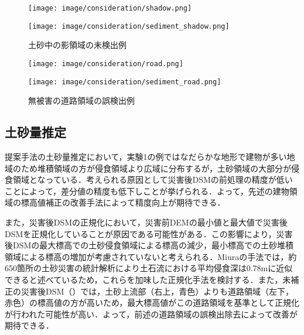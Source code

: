       \begin{figure}[tbp]
        \begin{minipage}[c]{0.5\hsize}
          \centering
          \texttt{[image: image/consideration/shadow.png]}
        \end{minipage}
        \begin{minipage}[c]{0.5\hsize}
          \centering
          \texttt{[image: image/consideration/sediment\_shadow.png]}
        \end{minipage}
        \caption{土砂中の影領域の未検出例}
        \label{影領域}
      \end{figure}
      
      \begin{figure}[tbp]
        \begin{minipage}[c]{0.5\hsize}
          \centering
          \texttt{[image: image/consideration/road.png]}
        \end{minipage}
        \begin{minipage}[c]{0.5\hsize}
          \centering
          \texttt{[image: image/consideration/sediment\_road.png]}
        \end{minipage}
        \caption{無被害の道路領域の誤検出例}
        \label{道路領域}
      \end{figure}


    \subsection*{土砂量推定}
      提案手法の土砂量推定において，実験1の例ではなだらかな地形で建物が多い地域のため堆積領域の方が侵食領域より広域に分布するが，土砂領域の大部分が侵食領域となっている．考えられる原因として災害後DSMの前処理の精度が低いことによって，差分値の精度も低下しことが挙げられる．よって，先述の建物領域の標高値補正の改善手法によって精度向上が期待できる．
      
      また，災害後DSMの正規化において，災害前DEMの最小値と最大値で災害後DSMを正規化していることが原因である可能性がある．この影響により，災害後DSMの最大標高での土砂侵食領域による標高の減少，最小標高での土砂堆積領域による標高の増加が考慮されていないと考えられる．Miuraの手法\cite{土砂量解析5}では，約650箇所の土砂災害の統計解析により土石流における平均侵食深は0.78mに近似できると述べているため，これらを加味した正規化手法を検討する．また，未補正の災害後DSM（）では，土砂上流部（右上，青色）よりも道路領域（左下，赤色）の標高値の方が高いため，最大標高値がこの道路領域を基準として正規化が行われた可能性が高い．よって，前述の道路領域の誤検出除去によって改善が期待できる．
      
